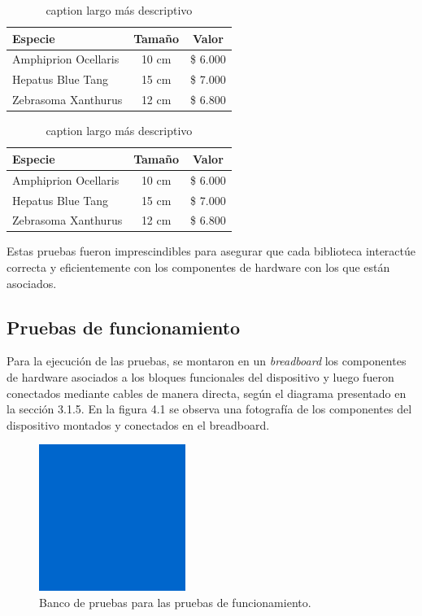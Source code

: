\begin{table}[h]
	\centering
	\caption[caption corto]{caption largo más descriptivo}
	\begin{tabular}{l c c}    
		\toprule
		\textbf{Especie} 	 & \textbf{Tamaño} 		& \textbf{Valor}  \\
		\midrule
		Amphiprion Ocellaris & 10 cm 				& \$ 6.000 \\		
		Hepatus Blue Tang	 & 15 cm				& \$ 7.000 \\
		Zebrasoma Xanthurus	 & 12 cm				& \$ 6.800 \\
		\bottomrule
		\hline
	\end{tabular}
	\label{tab:peces}
\end{table}

\begin{table}[h]
	\centering
	\caption[caption corto]{caption largo más descriptivo}
	\begin{tabular}{l c c}    
		\toprule
		\textbf{Especie} 	 & \textbf{Tamaño} 		& \textbf{Valor}  \\
		\midrule
		Amphiprion Ocellaris & 10 cm 				& \$ 6.000 \\		
		Hepatus Blue Tang	 & 15 cm				& \$ 7.000 \\
		Zebrasoma Xanthurus	 & 12 cm				& \$ 6.800 \\
		\bottomrule
		\hline
	\end{tabular}
	\label{tab:peces}
\end{table}

Estas pruebas fueron imprescindibles para asegurar que cada biblioteca interactúe correcta y eficientemente con los componentes de hardware con los que están asociados.

\subsection{Pruebas de funcionamiento}

Para la ejecución de las pruebas, se montaron en un \textit{breadboard} los componentes de hardware asociados a los bloques funcionales del dispositivo y luego fueron conectados mediante cables de manera directa, según el diagrama presentado en la sección 3.1.5. En la figura 4.1 se observa una fotografía de los componentes del dispositivo montados y conectados en el breadboard.

\begin{figure}[ht]
	\centering
	\includegraphics[scale=1.2]{./Figures/cuadradoAzul.png}
	\caption{Banco de pruebas para las pruebas de funcionamiento.}
	\label{fig:cuadradoAzul}
\end{figure}

